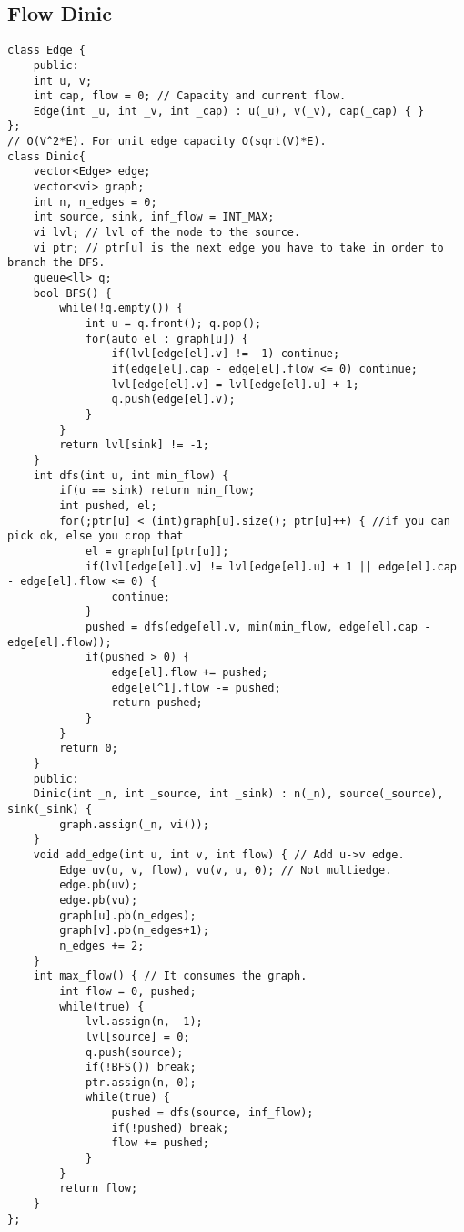 \documentclass[a4paper]{article}
\begin{document}
\subsection*{Flow Dinic}
\begin{verbatim}
class Edge {
    public:
    int u, v;
    int cap, flow = 0; // Capacity and current flow.
    Edge(int _u, int _v, int _cap) : u(_u), v(_v), cap(_cap) { }
};
// O(V^2*E). For unit edge capacity O(sqrt(V)*E).
class Dinic{
    vector<Edge> edge;
    vector<vi> graph;
    int n, n_edges = 0;
    int source, sink, inf_flow = INT_MAX;
    vi lvl; // lvl of the node to the source.
    vi ptr; // ptr[u] is the next edge you have to take in order to branch the DFS.
    queue<ll> q;
    bool BFS() {
        while(!q.empty()) {
            int u = q.front(); q.pop();
            for(auto el : graph[u]) {
                if(lvl[edge[el].v] != -1) continue;
                if(edge[el].cap - edge[el].flow <= 0) continue;
                lvl[edge[el].v] = lvl[edge[el].u] + 1;
                q.push(edge[el].v);
            }
        }
        return lvl[sink] != -1;
    }
    int dfs(int u, int min_flow) {
        if(u == sink) return min_flow;
        int pushed, el;
        for(;ptr[u] < (int)graph[u].size(); ptr[u]++) { //if you can pick ok, else you crop that
            el = graph[u][ptr[u]];
            if(lvl[edge[el].v] != lvl[edge[el].u] + 1 || edge[el].cap - edge[el].flow <= 0) {
                continue;
            }
            pushed = dfs(edge[el].v, min(min_flow, edge[el].cap - edge[el].flow));
            if(pushed > 0) {
                edge[el].flow += pushed;
                edge[el^1].flow -= pushed;
                return pushed;
            }
        }
        return 0;
    }
    public:
    Dinic(int _n, int _source, int _sink) : n(_n), source(_source), sink(_sink) {
        graph.assign(_n, vi());
    }
    void add_edge(int u, int v, int flow) { // Add u->v edge.
        Edge uv(u, v, flow), vu(v, u, 0); // Not multiedge.
        edge.pb(uv);
        edge.pb(vu);
        graph[u].pb(n_edges);
        graph[v].pb(n_edges+1);
        n_edges += 2;
    }
    int max_flow() { // It consumes the graph.
        int flow = 0, pushed;
        while(true) {
            lvl.assign(n, -1);
            lvl[source] = 0;
            q.push(source);
            if(!BFS()) break;
            ptr.assign(n, 0);
            while(true) {
                pushed = dfs(source, inf_flow);
                if(!pushed) break;
                flow += pushed;
            }
        }
        return flow;
    }
};
\end{verbatim}
\end{document}
